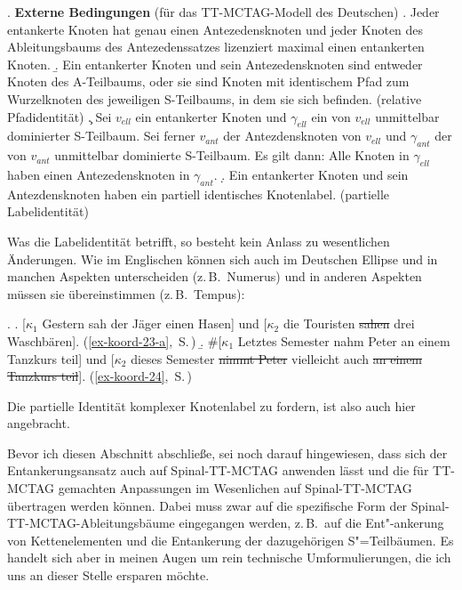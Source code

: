 \ex. {\bf Externe Bedingungen} (für das TT-MCTAG-Modell des Deutschen)
\a. Jeder entankerte Knoten hat genau einen Antezedensknoten und jeder Knoten des Ableitungsbaums des Antezedenssatzes lizenziert maximal einen entankerten Knoten.
\b. Ein entankerter Knoten und sein Antezedensknoten sind entweder Knoten des A-Teilbaums, oder sie sind Knoten mit identischem Pfad zum Wurzelknoten des jeweiligen S-Teilbaums, in dem sie sich befinden. (relative Pfadidentität) 
\c. Sei $v_{\mathit{ell}}$ ein entankerter Knoten und $\gamma_{\mathit{ell}}$ ein von $v_{\mathit{ell}}$ unmittelbar dominierter S-Teilbaum. Sei ferner $v_{\mathit{ant}}$ der Antezdensknoten von $v_{\mathit{ell}}$ und $\gamma_{\mathit{ant}}$ der von $v_{\mathit{ant}}$ unmittelbar dominierte S-Teilbaum. Es gilt dann: Alle Knoten in $\gamma_{\mathit{ell}}$ haben einen Antezedensknoten in $\gamma_{\mathit{ant}}$. 
\d. Ein entankerter Knoten und sein Antezdensknoten haben ein partiell identisches Knotenlabel. (partielle Labelidentität)   
 
Was die Labelidentität betrifft, so besteht kein Anlass zu wesentlichen Änderungen. Wie im Englischen können sich auch im Deutschen Ellipse und  in manchen Aspekten unterscheiden (z.\,B.\ Numerus) und in anderen Aspekten müssen sie übereinstimmen (z.\,B.\ Tempus): 

\ex. 
\a. [$\kappa_1$ Gestern sah der Jäger einen Hasen] und [$\kappa_2$ die Touristen \sout{sahen} drei Waschbären]. \hfill (\ref{ex-koord-23-a},~S.\,\pageref{ex-koord-23-a})\label{ex-koord-23-a-wdh}
\b. \#[$\kappa_1$ Letztes Semester nahm Peter an einem Tanzkurs teil] und [$\kappa_2$ dieses Semester \sout{nimmt Peter} vielleicht auch \sout{an einem Tanzkurs teil}].\label{ex-koord-24-wdh} \hfill (\ref{ex-koord-24},~S.\,\pageref{ex-koord-24})

Die partielle Identität komplexer Knotenlabel zu fordern, ist also auch hier angebracht.  %

Bevor ich diesen Abschnitt abschlie\ss e, sei noch darauf hingewiesen, dass sich der Entankerungsansatz auch auf Spinal-TT-MCTAG anwenden lässt und die für TT-MCTAG gemachten Anpassungen im Wesenlichen auf Spinal-TT-MCTAG übertragen werden können. Dabei muss zwar auf die spezifische Form der Spinal-TT-MCTAG-Ableitungsbäume eingegangen werden, z.\,B.\ auf die Ent"-ankerung von Kettenelementen und die Entankerung der dazugehörigen S"=Teilbäumen. Es handelt sich aber in meinen Augen um rein technische Umformulierungen, die ich uns an dieser Stelle ersparen möchte. \\

